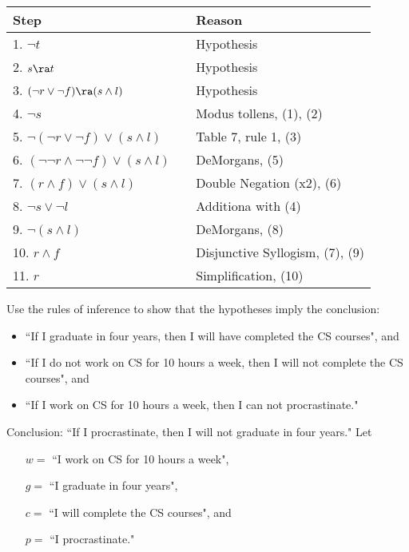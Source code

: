 \begin{questions}
\begin{solution}
    \begin{tabular}{lll}
        Step   & \hspace{0.2in}     & Reason \\
        \hline
        1. $\neg t$                 &   & Hypothesis \\
        2. $s \ra t$                &   & Hypothesis \\
        3. $(\neg r \vee \neg f) \ra (s \wedge l)$  &   & Hypothesis \\
        4. $\neg s$                 &   & Modus tollens, (1), (2) \\
        5. $\neg (\neg r \vee \neg f) \vee (s \wedge l) $  & & Table 7, rule 1, (3) \\
        6. $(\neg \neg r \wedge \neg \neg f) \vee (s \wedge l)$  & & DeMorgans,  (5) \\
        7. $(r \wedge f) \vee (s \wedge l)$     & & Double Negation (x2), (6) \\
        8. $\neg s \vee \neg l$     &   & Additiona with (4) \\
        9. $\neg (s \wedge l)$      &   & DeMorgans, (8) \\
        10. $r \wedge f$            &   & Disjunctive Syllogism, (7), (9) \\
        11. $r$                     &   & Simplification, (10)
    \end{tabular}
\end{solution}



 Use the rules of inference to show that the hypotheses imply the conclusion:
\begin{itemize}[itemsep=0pt,parsep=0pt,topsep=0pt,partopsep=0pt]
    \item ``If I graduate in four years, then I will have completed the CS courses", and
    \item ``If I do not work on CS for 10 hours a week, then I will not complete the CS courses", and
    \item ``If I work on CS for 10 hours a week, then I can not procrastinate."
\end{itemize}
Conclusion: ``If I procrastinate, then I will not graduate in four years."
Let
\begin{itemize}[itemsep=0pt,parsep=0pt,topsep=0pt,partopsep=0pt]
    \item[$w = $] ``I work on CS for 10 hours a week",
    \item[$g = $] ``I graduate in four years",
    \item[$c = $] ``I will complete the CS courses", and
    \item[$p = $] ``I procrastinate."
\end{itemize}


\end{questions}
